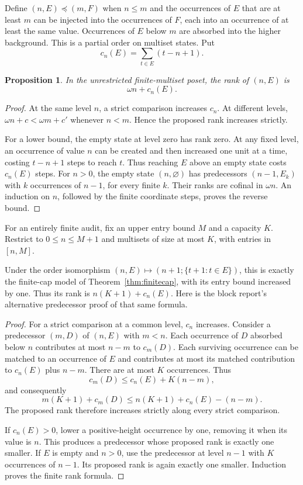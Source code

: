 \documentclass[11pt,a4paper]{article}
\newtheorem{proposition}[theorem]{Proposition}
\theoremstyle{definition}
\begin{document}
Define $(n,E)\preceq(m,F)$ when $n\le m$ and the occurrences of $E$ that are at least $m$ can be injected into the occurrences of $F$, each into an occurrence of at least the same value. Occurrences of $E$ below $m$ are absorbed into the higher background. This is a partial order on multiset states. Put
\[
 c_n(E)=\sum_{t\in E}(t-n+1).
\]

\begin{proposition}\label{block:prop:unbounded-model}
In the unrestricted finite-multiset poset, the rank of $(n,E)$ is
\[
 \omega n+c_n(E).
\]
\end{proposition}
\begin{proof}
At the same level $n$, a strict comparison increases $c_n$. At different levels, $\omega n+c<\omega m+c'$ whenever $n<m$. Hence the proposed rank increases strictly.

For a lower bound, the empty state at level zero has rank zero. At any fixed level, an occurrence of value $n$ can be created and then increased one unit at a time, costing $t-n+1$ steps to reach $t$. Thus reaching $E$ above an empty state costs $c_n(E)$ steps. For $n>0$, the empty state $(n,\varnothing)$ has predecessors $(n-1,E_k)$ with $k$ occurrences of $n-1$, for every finite $k$. Their ranks are cofinal in $\omega n$. An induction on $n$, followed by the finite coordinate steps, proves the reverse bound.
\end{proof}

For an entirely finite audit, fix an upper entry bound $M$ and a capacity $K$. Restrict to $0\le n\le M+1$ and multisets of size at most $K$, with entries in $[n,M]$.

Under the order isomorphism
$(n,E)\mapsto(n+1;\{t+1:t\in E\})$, this is exactly the finite-cap
model of Theorem~\ref{thm:finitecap}, with its entry bound increased by one.
Thus its rank is $n(K+1)+c_n(E)$. Here is the block report's alternative
predecessor proof of that same formula.

\begin{proof}
For a strict comparison at a common level, $c_n$ increases. Consider a predecessor $(m,D)$ of $(n,E)$ with $m<n$. Each occurrence of $D$ absorbed below $n$ contributes at most $n-m$ to $c_m(D)$. Each surviving occurrence can be matched to an occurrence of $E$ and contributes at most its matched contribution to $c_n(E)$ plus $n-m$. There are at most $K$ occurrences. Thus
\[
 c_m(D)\le c_n(E)+K(n-m),
\]
and consequently
\[
 m(K+1)+c_m(D)\le n(K+1)+c_n(E)-(n-m).
\]
The proposed rank therefore increases strictly along every strict comparison.

If $c_n(E)>0$, lower a positive-height occurrence by one, removing it when its value is $n$. This produces a predecessor whose proposed rank is exactly one smaller. If $E$ is empty and $n>0$, use the predecessor at level $n-1$ with $K$ occurrences of $n-1$. Its proposed rank is again exactly one smaller. Induction proves the finite rank formula.
\end{proof}
\end{document}
